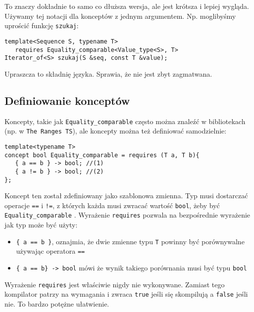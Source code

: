 \documentclass[11pt, a4paper]{article}
\begin{document}
To znaczy dokładnie to samo co dłuższa wersja, ale jest krótsza i lepiej wygląda. Używamy tej notacji dla konceptów z jednym argumentem. Np. moglibyśmy uprościć funkcję \verb#szukaj#: \newline

\begin{lstlisting}[frame=single]
template<Sequence S, typename T>
   requires Equality_comparable<Value_type<S>, T>
Iterator_of<S> szukaj(S &seq, const T &value);
\end{lstlisting}

Upraszcza to składnię języka. Sprawia, że nie jest zbyt zagmatwana.

\subsection{Definiowanie konceptów}

Koncepty, takie jak \verb#Equality_comparable# często można znaleźć w bibliotekach (np. w \verb#The Ranges TS#), ale koncepty można też definiować samodzielnie: \newline

\begin{lstlisting}[frame=single]
template<typename T>
concept bool Equality_comparable = requires (T a, T b){
   { a == b } -> bool; //(1)
   { a != b } -> bool; //(2)
};

\end{lstlisting}

Koncept ten został zdefiniowany jako szablonowa zmienna. Typ musi dostarczać operacje \verb#==# i \verb#!=#, z których każda musi zwracać wartość \verb#bool#, żeby być \verb#Equality_comparable#
. Wyrażenie \verb#requires# pozwala na bezpośrednie wyrażenie jak typ może być użyty:

\begin{itemize}

\item \verb#{ a == b }#, oznajmia, że dwie zmienne typu \verb#T# powinny być porównywalne używając operatora \verb#==#

\item \verb#{ a == b} -> bool# mówi że wynik takiego porównania musi być typu \verb#bool#

\end{itemize}

Wyrażenie \verb#requires# jest właściwie nigdy nie wykonywane. Zamiast tego kompilator patrzy na wymagania  i zwraca \verb#true# jeśli się skompilują a \verb#false# jeśli nie. To bardzo potężne ułatwienie. 
\end{document}

